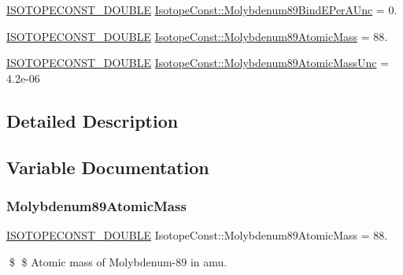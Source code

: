 \begin{DoxyCompactItemize}
\mbox{\hyperlink{group___isotope_const-_macros_ga8f45a7272ce02c0b4c65c44636ed719a}{I\+S\+O\+T\+O\+P\+E\+C\+O\+N\+S\+T\+\_\+\+D\+O\+U\+B\+LE}} \mbox{\hyperlink{group___isotope_const-_molybdenum-_mo89_ga469fb72f0ea53993da082384a0021ab6}{Isotope\+Const\+::\+Molybdenum89\+Bind\+E\+Per\+A\+Unc}} = 0.
\item 
\mbox{\hyperlink{group___isotope_const-_macros_ga8f45a7272ce02c0b4c65c44636ed719a}{I\+S\+O\+T\+O\+P\+E\+C\+O\+N\+S\+T\+\_\+\+D\+O\+U\+B\+LE}} \mbox{\hyperlink{group___isotope_const-_molybdenum-_mo89_ga2120db827d8461a511f9372ea6af34c5}{Isotope\+Const\+::\+Molybdenum89\+Atomic\+Mass}} = 88.
\item 
\mbox{\hyperlink{group___isotope_const-_macros_ga8f45a7272ce02c0b4c65c44636ed719a}{I\+S\+O\+T\+O\+P\+E\+C\+O\+N\+S\+T\+\_\+\+D\+O\+U\+B\+LE}} \mbox{\hyperlink{group___isotope_const-_molybdenum-_mo89_ga3b04292cfb3fd50bc35522ee60c1a170}{Isotope\+Const\+::\+Molybdenum89\+Atomic\+Mass\+Unc}} = 4.\+2e-\/06
\end{DoxyCompactItemize}


\subsection{Detailed Description}


\subsection{Variable Documentation}
\mbox{\label{group___isotope_const-_molybdenum-_mo89_ga2120db827d8461a511f9372ea6af34c5}} 
\subsubsection{\texorpdfstring{Molybdenum89\+Atomic\+Mass}{Molybdenum89AtomicMass}}
{\footnotesize\ttfamily \mbox{\hyperlink{group___isotope_const-_macros_ga8f45a7272ce02c0b4c65c44636ed719a}{I\+S\+O\+T\+O\+P\+E\+C\+O\+N\+S\+T\+\_\+\+D\+O\+U\+B\+LE}} Isotope\+Const\+::\+Molybdenum89\+Atomic\+Mass = 88.}

\$ \$ Atomic mass of Molybdenum-\/89 in amu. \mbox{\label{group___isotope_const-_molybdenum-_mo89_ga3b04292cfb3fd50bc35522ee60c1a170}} 

